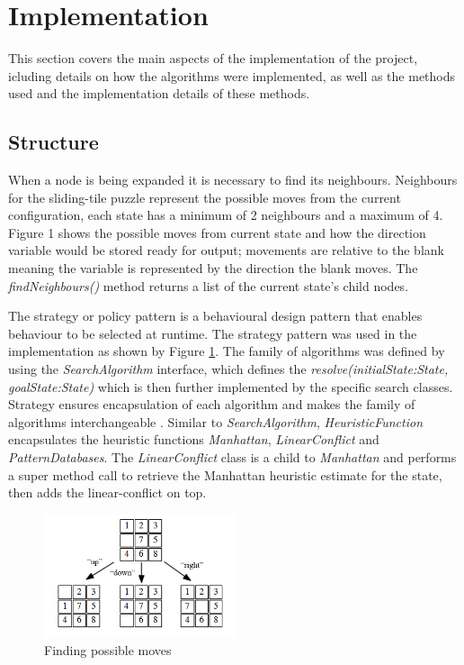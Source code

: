 \documentclass[final]{cmpreport}
\begin{document}
\section{Implementation}
This section covers the main aspects of the implementation of the project, icluding details on how the algorithms were implemented, as well as the methods used and the implementation details of these methods.





\subsection{Structure}

When a node is being expanded it is necessary to find its neighbours. Neighbours for the sliding-tile puzzle represent the possible moves from the current configuration, each state has a minimum of 2 neighbours and a maximum of 4. Figure 1 shows the possible moves from current state and how the direction variable would be stored ready for output; movements are relative to the blank meaning the variable is represented by the direction the blank moves. The \textit{findNeighbours()} method returns a list of the current state's child nodes. 

The strategy or policy pattern is a behavioural design pattern that enables behaviour to be selected at runtime. The strategy pattern was used in the implementation as shown by Figure \ref{figure:classDiagram}. The family of algorithms was defined by using the \textit{SearchAlgorithm} interface, which defines the \textit{resolve(initialState:State, goalState:State)} which is then further implemented by the specific search classes. Strategy ensures encapsulation of each algorithm and makes the family of algorithms interchangeable \cite{gamma1995design}. Similar to \textit{SearchAlgorithm}, \textit{HeuristicFunction} encapsulates the heuristic functions \textit{Manhattan}, \textit{LinearConflict} and \textit{PatternDatabases}. The \textit{LinearConflict} class is a child to \textit{Manhattan} and performs a super method call to retrieve the Manhattan heuristic estimate for the state, then adds the linear-conflict on top.

\begin{figure}[ht]
	\centering
	\includegraphics[width=0.5\textwidth]{moves}
	\captionsetup{justification=centering}
	\caption{Finding possible moves}
	\label{figure:classDiagram}
\end{figure}
\end{document}

